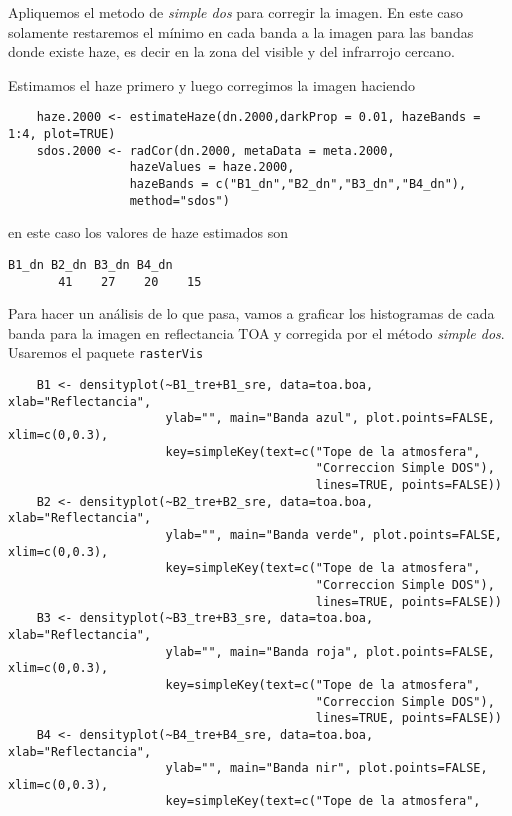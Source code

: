 \begin{exa}
    Apliquemos el metodo de \emph{simple dos} para corregir la imagen. En este caso
    solamente restaremos el m\'inimo en cada banda a la imagen para las bandas
    donde existe haze, es decir en la zona del visible y del infrarrojo cercano.

    Estimamos el haze primero y luego corregimos la imagen haciendo
    \begin{lstlisting}
    haze.2000 <- estimateHaze(dn.2000,darkProp = 0.01, hazeBands = 1:4, plot=TRUE)
    sdos.2000 <- radCor(dn.2000, metaData = meta.2000,
                 hazeValues = haze.2000,
                 hazeBands = c("B1_dn","B2_dn","B3_dn","B4_dn"),
                 method="sdos")
    \end{lstlisting}
    en este caso los valores de haze estimados son
    \begin{Verbatim}[fontsize=\small]
    B1_dn B2_dn B3_dn B4_dn
       41    27    20    15
    \end{Verbatim}
    Para hacer un an\'alisis de lo que pasa, vamos a graficar los
    histogramas de cada banda para la imagen en reflectancia TOA y corregida por
    el m\'etodo \emph{simple dos}. Usaremos el paquete \texttt{rasterVis}
    \begin{lstlisting}
    B1 <- densityplot(~B1_tre+B1_sre, data=toa.boa, xlab="Reflectancia",
                      ylab="", main="Banda azul", plot.points=FALSE, xlim=c(0,0.3),
                      key=simpleKey(text=c("Tope de la atmosfera",
                                           "Correccion Simple DOS"),
                                           lines=TRUE, points=FALSE))
    B2 <- densityplot(~B2_tre+B2_sre, data=toa.boa, xlab="Reflectancia",
                      ylab="", main="Banda verde", plot.points=FALSE, xlim=c(0,0.3),
                      key=simpleKey(text=c("Tope de la atmosfera",
                                           "Correccion Simple DOS"),
                                           lines=TRUE, points=FALSE))
    B3 <- densityplot(~B3_tre+B3_sre, data=toa.boa, xlab="Reflectancia",
                      ylab="", main="Banda roja", plot.points=FALSE, xlim=c(0,0.3),
                      key=simpleKey(text=c("Tope de la atmosfera",
                                           "Correccion Simple DOS"),
                                           lines=TRUE, points=FALSE))
    B4 <- densityplot(~B4_tre+B4_sre, data=toa.boa, xlab="Reflectancia",
                      ylab="", main="Banda nir", plot.points=FALSE, xlim=c(0,0.3),
                      key=simpleKey(text=c("Tope de la atmosfera",

\end{lstlisting}
\end{exa}
